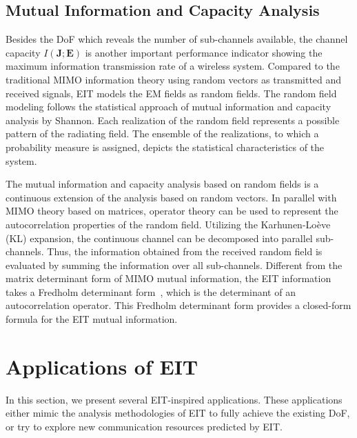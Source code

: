 \documentclass[journal,twocolumn]{IEEEtran}
\begin{document}
\subsection{Mutual Information and Capacity Analysis}
Besides the DoF which reveals the number of sub-channels available, the channel capacity $I({\bm J}; {\bm E})$ is another important performance indicator showing the maximum information transmission rate of a wireless system. 
Compared to the traditional MIMO information theory using random vectors as transmitted and received signals, EIT models the EM fields as random fields. 
The random field modeling follows the statistical approach of mutual information and capacity analysis by Shannon. 
Each realization of the random field represents a possible pattern of the radiating field. The ensemble of the realizations, to which a probability measure is assigned, depicts the statistical characteristics of the system. 

The mutual information and capacity analysis based on random fields is a continuous extension of the analysis based on random vectors. 
In parallel with MIMO theory based on matrices, operator theory can be used to represent the autocorrelation properties of the random field. 
Utilizing the Karhunen-Lo\`{e}ve (KL) expansion, the continuous channel can be decomposed into parallel sub-channels. 
Thus, the information obtained from the received random field is evaluated by summing the information over all sub-channels. 
Different from the matrix determinant form of MIMO mutual information, the EIT information takes a Fredholm determinant form~\cite{wan2022mutual}, which is the determinant of an autocorrelation operator. 
This Fredholm determinant form provides a closed-form formula for the EIT mutual information. 

\section{Applications of EIT}
In this section, we present several EIT-inspired applications. 
These applications either mimic the analysis methodologies of EIT to fully achieve the existing DoF, or try to explore new communication resources predicted by EIT. 

\vspace{-1em}
\end{document}
